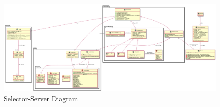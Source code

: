 \begin{figure}
    \includegraphics[width=\textwidth,height=\textheight,keepaspectratio]{../diagrams/class-diagrams/selectorClasses.png}
    \caption{Selector-Server Diagram}
    \label{fig:PropProf}
\end{figure}

